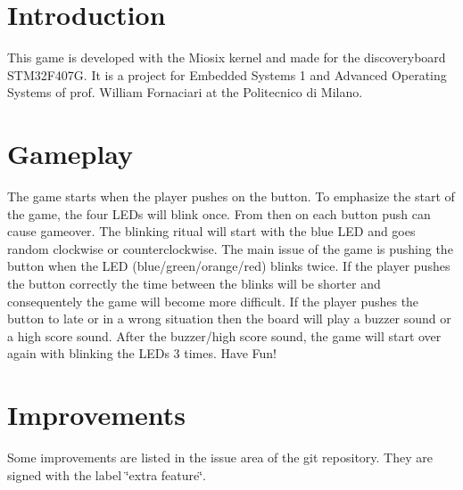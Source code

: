\hypertarget{index_Introduction}{}\section{Introduction}\label{index_Introduction}
This game is developed with the Miosix kernel and made for the discoveryboard S\+T\+M32\+F407G. It is a project for Embedded Systems 1 and Advanced Operating Systems of prof. William Fornaciari at the Politecnico di Milano.\hypertarget{index_Gameplay}{}\section{Gameplay}\label{index_Gameplay}
The game starts when the player pushes on the button. To emphasize the start of the game, the four L\+ED\textquotesingle{}s will blink once. From then on each button push can cause gameover. The blinking ritual will start with the blue L\+ED and goes random clockwise or counterclockwise. The main issue of the game is pushing the button when the L\+ED (blue/green/orange/red) blinks twice. If the player pushes the button correctly the time between the blinks will be shorter and consequentely the game will become more difficult. If the player pushes the button to late or in a wrong situation then the board will play a buzzer sound or a high score sound. After the buzzer/high score sound, the game will start over again with blinking the L\+ED\textquotesingle{}s 3 times. Have Fun!\hypertarget{index_Improvements}{}\section{Improvements}\label{index_Improvements}
Some improvements are listed in the issue area of the git repository. They are signed with the label \char`\"{}extra feature\char`\"{}. 